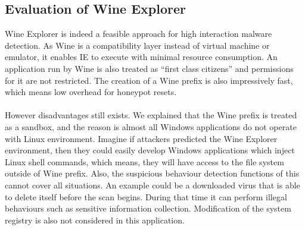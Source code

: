 \subsection{Evaluation of Wine Explorer}
Wine Explorer is indeed a feasible approach for high interaction malware 
detection. As Wine is a compatibility layer instead of virtual machine or 
emulator, it enables IE to execute with minimal resource consumption. 
An application run by Wine is also 
treated as ``first class citizens''\cite{wineperformance} and 
permissions for it are not 
restricted. The creation of a Wine prefix is also impressively fast, which 
means low overhead for honeypot resets. 
\paragraph{}
However disadvantages still exists. We explained that the Wine prefix is treated
as a sandbox, and the reason is almost all Windows applications do not operate 
with Linux environment. Imagine if attackers predicted the Wine Explorer 
environment, then they could easily develop Windows applications which inject 
Linux shell commands, which means, they will have access to the file system 
outside of Wine prefix. Also, the suspicious behaviour detection functions of 
this cannot cover all situations. An example 
could 
be a downloaded virus that is able to delete itself before the scan begins. 
During that time it can perform illegal behaviours such as 
sensitive information collection. Modification of the system 
registry is also not considered in this application. 
